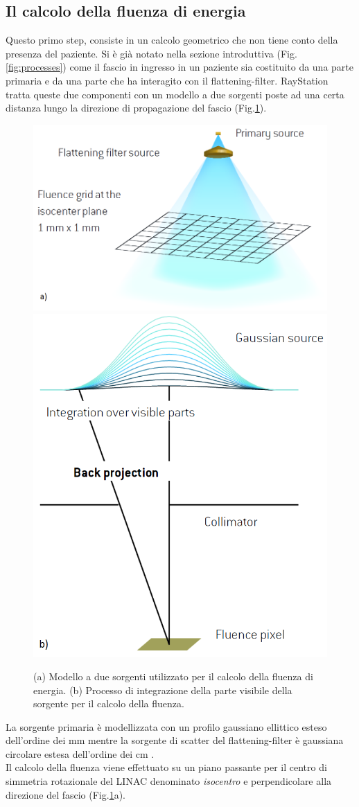 {\subsection{Il calcolo della fluenza di energia}
\label{sec:fluence}
Questo primo step, consiste in un calcolo geometrico che non tiene conto della presenza del paziente. Si è già notato nella sezione introduttiva (Fig.\ref{fig:processes}) come il fascio in ingresso in un paziente sia costituito da una parte primaria e da una parte che ha interagito con il flattening-filter. RayStation tratta queste due componenti con un modello a due sorgenti poste ad una certa distanza lungo la direzione di propagazione del fascio (Fig.\ref{fig:twosources}).
\begin{figure}
\centering
\includegraphics[width=.55\textwidth]{./cap1/twosources.png}
\includegraphics[width=.4\textwidth]{./cap1/source_int.png}
\caption{ (a) Modello a due sorgenti utilizzato per il calcolo della fluenza di energia. (b) Processo di integrazione della parte visibile della sorgente per il calcolo della fluenza.}
\label{fig:twosources}
\end{figure}
La sorgente primaria è modellizzata con un profilo gaussiano ellittico esteso dell'ordine dei mm mentre la sorgente di scatter del flattening-filter è gaussiana circolare estesa dell'ordine dei cm \cite{Chaney1994}.\\
Il calcolo della fluenza viene effettuato su un piano passante per il centro di simmetria rotazionale del LINAC denominato \textit{isocentro} e perpendicolare alla direzione del fascio (Fig.\ref{fig:twosources}a).
}
